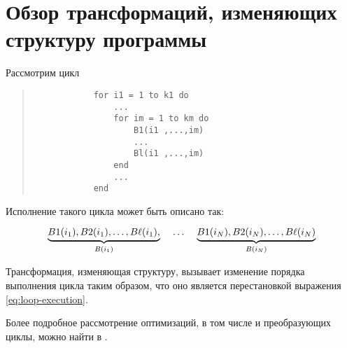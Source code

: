 \section{Обзор трансформаций, изменяющих структуру программы}

Рассмотрим цикл

\begin{center}
    \begin{quote}
        \begin{verbatim}
            for i1 = 1 to k1 do
                ...
                for im = 1 to km do
                    B1(i1 ,...,im)
                    ...
                    Bl(i1 ,...,im)
                end
                ...
            end
        \end{verbatim}
    \end{quote}
\end{center}

Исполнение такого цикла может быть описано так:

\begin{equation}\label{eq:loop-execution}
    \underbrace{B1(i_{1}), B2(i_{1}), \ldots, B\ell(i_{1}),}_{B(i_{1})} 
    \hspace{4mm} \ldots \hspace{4mm} 
    \underbrace{B1(i_{N}), B2(i_{N}), \ldots, B\ell(i_{N})}_{B(i_{N})}
\end{equation}

Трансформация, изменяющая структуру, вызывает изменение порядка выполнения цикла таким образом, что оно является перестановкой выражения \ref{eq:loop-execution}.

Более подробное рассмотрение оптимизаций, в том числе и преобразующих циклы, можно найти в \cite{ZuckPFGH02,Bacon}.
